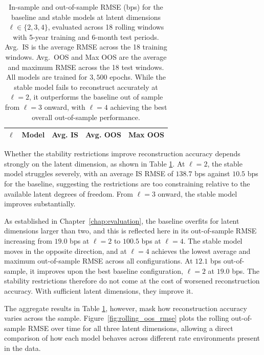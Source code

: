 \begin{table}[H]
\centering
{\small
\begin{tabular}{@{}llrrr@{}}
\toprule
\textbf{\(\ell\)} & \textbf{Model} & \textbf{Avg. IS} & \textbf{Avg. OOS} & \textbf{Max OOS }\\
\midrule

\end{tabular}
}
\caption{In-sample and out-of-sample RMSE (bps) for the baseline and stable models at latent dimensions $\ell \in \{2, 3, 4\}$, evaluated across 18 rolling windows with 5-year training and 6-month test periods. Avg.\ IS is the average RMSE across the 18 training windows. Avg.\ OOS and Max OOS are the average and maximum RMSE across the 18 test windows. All models are trained for $3{,}500$ epochs. While the stable model fails to reconstruct accurately at $\ell = 2$, it outperforms the baseline out of sample from $\ell = 3$ onward, with $\ell = 4$ achieving the best overall out-of-sample performance.}
\label{tab:oos_summary_sim}
\end{table}

Whether the stability restrictions improve reconstruction accuracy depends strongly on the latent dimension, as shown in Table \ref{tab:oos_summary_sim}. At $\ell=2$, the stable model struggles severely, with an average IS RMSE of $138.7$ bps against $10.5$ bps for the baseline, suggesting the restrictions are too constraining relative to the available latent degrees of freedom. From $\ell=3$ onward, the stable model improves substantially. 

As established in Chapter~\ref{chap:evaluation}, the baseline overfits for latent dimensions larger than two, and this is reflected here in its out-of-sample RMSE increasing from $19.0$ bps at $\ell=2$ to $100.5$ bps at $\ell=4$. The stable model moves in the opposite direction, and at $\ell=4$ achieves the lowest average and maximum out-of-sample RMSE across all configurations. At $12.1$ bps out-of-sample, it improves upon the best baseline configuration, $\ell=2$ at $19.0$ bps. The stability restrictions therefore do not come at the cost of worsened reconstruction accuracy. With sufficient latent dimensions, they improve it.

The aggregate results in Table \ref{tab:oos_summary_sim}, however, mask how reconstruction accuracy varies across the sample. Figure~\ref{fig:rolling_oos_rmse} plots the rolling out-of-sample RMSE over time for all three latent dimensions, allowing a direct comparison of how each model behaves across different rate environments present in the data.

